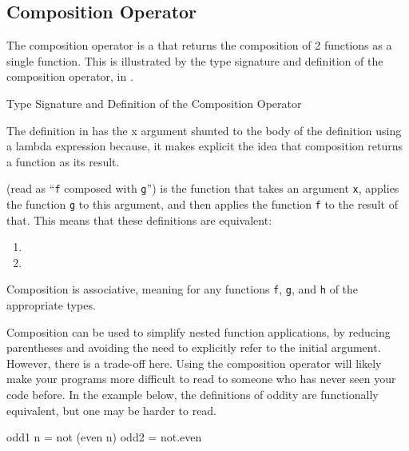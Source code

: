 \subsection{Composition Operator}\label{subsec:Composition_Operator}
The composition operator is a  that returns the composition of 2 functions as a single function.
This is illustrated by the type signature and definition of the composition operator,  in .

\begin{listing}[h!tbp]
\caption{Type Signature and Definition of the Composition Operator}
\label{lst:Composition_Operator-Signature_Def}
\end{listing}

The definition in  has the x argument shunted to the body of the definition using a lambda expression because, it makes explicit the idea that composition returns a function as its result.

 (read as ``\texttt{f} composed with \texttt{g}'') is the function that takes an argument \texttt{x}, applies the function \texttt{g} to this argument, and then applies the function \texttt{f} to the result of that.
This means that these definitions are equivalent:
\begin{enumerate}[noitemsep]
\item {}
\item {}
\end{enumerate}

Composition is associative, meaning  for any functions \texttt{f}, \texttt{g}, and \texttt{h} of the appropriate types.

Composition can be used to simplify nested function applications, by reducing parentheses and avoiding the need to explicitly refer to the initial argument.
However, there is a trade-off here.
Using the composition operator will likely make your programs more difficult to read to someone who has never seen your code before.
In the example below, the definitions of oddity are functionally equivalent, but one may be harder to read.
\begin{haskellsource}
odd1 n = not (even n)
odd2 = not.even
\end{haskellsource}

